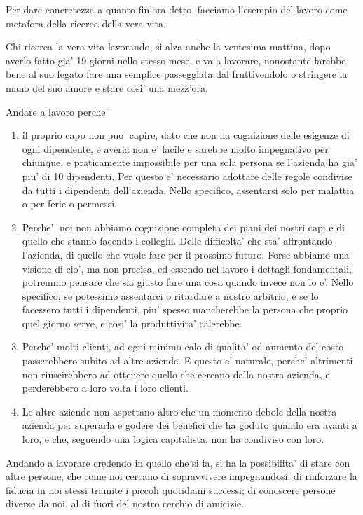 Per dare concretezza a quanto fin'ora detto, facciamo l'esempio del lavoro come metafora della ricerca della vera vita.

Chi ricerca la vera vita lavorando, si alza anche la ventesima mattina, dopo averlo fatto gia' 19 giorni nello stesso mese, e va a lavorare, nonostante farebbe bene al suo fegato fare una semplice passeggiata dal fruttivendolo o
stringere la mano del suo amore e stare cosi' una mezz'ora.

Andare a lavoro perche' 
\begin{enumerate}
    \item il proprio capo non puo' capire, dato che non ha cognizione delle esigenze di ogni dipendente, e averla non e' facile e sarebbe molto impegnativo per chiunque, e praticamente impossibile per una sola persona se l'azienda ha gia' piu' di 10 dipendenti.
        Per questo e' necessario adottare delle regole condivise da tutti i dipendenti dell'azienda. Nello specifico, assentarsi solo per malattia o per ferie o permessi.
    \item Perche', noi non abbiamo cognizione completa dei piani dei nostri capi e di quello che stanno facendo i colleghi. Delle difficolta' che sta' affrontando l'azienda, di quello che vuole fare per il prossimo futuro.
   Forse abbiamo una visione di cio', ma non precisa, ed essendo nel lavoro i dettagli fondamentali, potremmo pensare che sia giusto fare una cosa quando invece non lo e'. Nello specifico, se potessimo assentarci o ritardare a nostro arbitrio, e se lo facessero tutti i dipendenti, piu' spesso mancherebbe la persona che proprio quel giorno serve, e cosi' la produttivita' calerebbe.
    \item Perche' molti clienti, ad ogni minimo calo di qualita' od aumento del costo passerebbero subito ad altre aziende. E questo e' naturale, perche' altrimenti non riuscirebbero ad ottenere quello che cercano dalla nostra azienda, e perderebbero a loro volta i loro clienti.
    \item Le altre aziende non aspettano altro che un momento debole della nostra azienda per superarla e godere dei benefici che ha goduto quando era avanti a loro, e che, seguendo una logica capitalista, non ha condiviso con loro.

\end{enumerate}
Andando a lavorare credendo in quello che si fa, si ha la possibilita' di stare con altre persone, che come noi cercano di sopravvivere impegnandosi; di rinforzare la fiducia in noi stessi tramite i piccoli quotidiani successi; di conoscere persone diverse da noi, al di fuori del nostro cerchio di amicizie.

